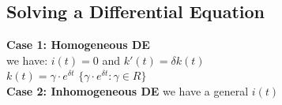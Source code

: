 \documentclass{article}
\begin{document}
\subsection{Solving a Differential Equation}
\textbf{Case 1: Homogeneous DE}\\[2mm]
we have: 
\hspace{10mm}$i(t) = 0$ \hspace{5mm}and
\hspace{5mm}$k'(t) = \delta k(t)$ \\[2mm]
 $k(t)=\gamma\cdot e^{\delta t}$ \newline
{} $\{\gamma\cdot e^{\delta t} : \gamma \in R\}$ \\[3mm]
\textbf{Case 2: Inhomogeneous DE} \hspace{5mm} we have a general $i(t)$ 
\end{document}
